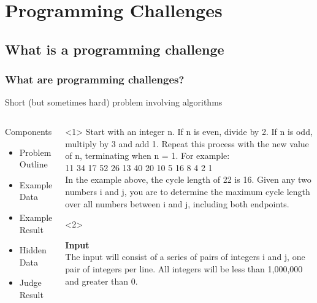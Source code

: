 \documentclass{beamer}
\begin{document}
\section{Programming Challenges}
\subsection{What is a programming challenge}

\begin{frame}
  \frametitle{What are programming challenges?}
  \begin{center}
    Short (but sometimes hard) problem involving algorithms
  \end{center}

  \begin{columns}[c]
    \begin{block}{Components}
      \begin{itemize}
      \item \alert<1>{Problem Outline}
      \item \alert<2-3>{Example Data}
      \item \alert<2-3>{Example Result}
      \item \alert<4>{Hidden Data}
      \item \alert<5>{Judge Result}
      \end{itemize}
    \end{block}
    \begin{block}{}
      \begin{onlyenv}<1>
        {\small
        Start with an integer n. If n is even, divide by 2. If n is
        odd, multiply by 3 and add 1. Repeat this process with the new
        value of n, terminating when n = 1. For example:\\
         11 34 17 52 26 13 40 20 10 5 16 8 4 2 1\\
        \medskip
        In the example above, the cycle length of 22 is 16. Given any
        two numbers i and j, you are to determine the maximum cycle
        length over all numbers between i and j, including both
        endpoints.}
      \end{onlyenv}
      \begin{onlyenv}<2>
        {\small
        {\bf Input}\\        
        The input will consist of a series of pairs of integers i and
        j, one pair of integers per line. All integers will be less
        than 1,000,000 and greater than 0.\\
        \smallskip

}
\end{onlyenv}
\end{block}
\end{columns}
\end{frame}
\end{document}
